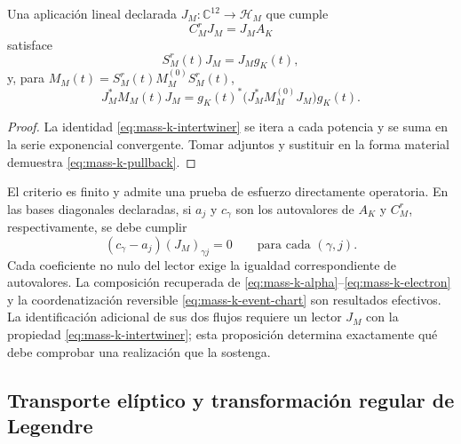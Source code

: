 \begin{proposition}
Una aplicación lineal declarada
\(J_M:\mathbb C^{12}\to\mathscr H_M\) que cumple
\begin{equation}
 C_M^rJ_M=J_MA_K
 \label{eq:mass-k-intertwiner}
\end{equation}
satisface
\[
 S_M^r(t)J_M=J_Mg_K(t),
\]
y, para \(M_M(t)=S_M^r(t)M_M^{(0)}S_M^r(t)\),
\begin{equation}
 J_M^*M_M(t)J_M
 =g_K(t)^*\bigl(J_M^*M_M^{(0)}J_M\bigr)g_K(t).
 \label{eq:mass-k-pullback}
\end{equation}
\end{proposition}
\begin{proof}
La identidad \eqref{eq:mass-k-intertwiner} se itera a cada potencia
y se suma en la serie exponencial convergente. Tomar adjuntos y
sustituir en la forma material demuestra
\eqref{eq:mass-k-pullback}.
\end{proof}

El criterio es finito y admite una prueba de esfuerzo directamente
operatoria. En las bases diagonales declaradas, si \(a_j\) y
\(c_\gamma\) son los autovalores de \(A_K\) y \(C_M^r\),
respectivamente, se debe cumplir
\[
 (c_\gamma-a_j)(J_M)_{\gamma j}=0
 \qquad\text{para cada }(\gamma,j).
\]
Cada coeficiente no nulo del lector exige la igualdad correspondiente
de autovalores. La composición recuperada de
\eqref{eq:mass-k-alpha}--\eqref{eq:mass-k-electron} y la coordenatización reversible
\eqref{eq:mass-k-event-chart} son resultados efectivos. La identificación
adicional de sus dos flujos requiere un lector \(J_M\) con la propiedad
\eqref{eq:mass-k-intertwiner}; esta proposición determina exactamente
qué debe comprobar una realización que la sostenga.

\subsection{Transporte elíptico y transformación regular de Legendre}


